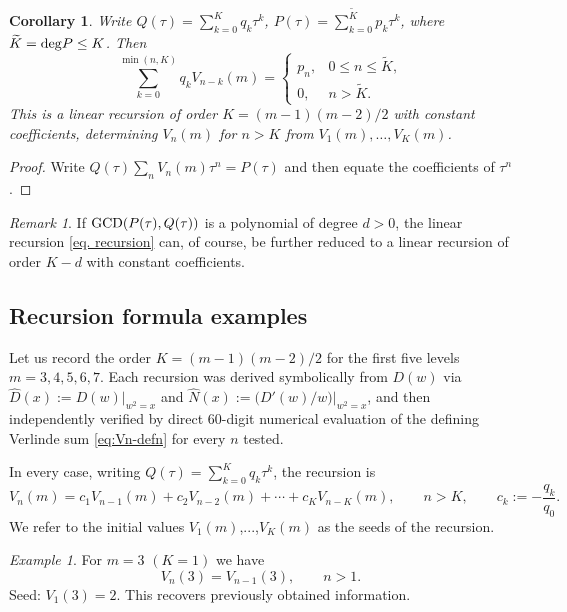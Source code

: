 \documentclass[11pt,reqno]{amsart}
\newtheorem{corollary}[theorem]{Corollary}
\theoremstyle{remark}
\newtheorem{remark}[theorem]{Remark}
\newtheorem{example}[theorem]{Example}
\begin{document}
\begin{corollary}
\label{cor:recursion}
Write $Q(\tau)=\sum_{k=0}^Kq_k\tau^k$, $P(\tau)=\sum_{k=0}^{\widetilde K}p_k\tau^k$, where $\widetilde{K}={\rm deg}P\leq K$.
Then
\begin{equation}\label{eq. recursion}
\sum_{k=0}^{\min(n,K)}q_kV_{n-k}(m) = \begin{cases}p_n, & 0\le n\le \widetilde K,\\0, & n>\widetilde K.\end{cases}
\end{equation}
This is a linear recursion of order $K=(m-1)(m-2)/2$ with constant
coefficients, determining $V_n(m)$ for $n>K$ from
$V_1(m),\dots,V_{K}(m)$.
\end{corollary}

\begin{proof}
Write $Q(\tau)\sum_nV_n(m)\tau^n=P(\tau)$
 and then equate the coefficients of
$\tau^n$.
\end{proof}

\begin{remark}
  If ${\rm GCD}(P(\tau), Q(\tau))$ is a polynomial of degree $d>0$, the linear recursion \eqref{eq. recursion} can, of course, be further reduced to a linear recursion of order $K-d$ with constant coefficients.
\end{remark}

\subsection{Recursion formula examples}\label{subsec:Recursion_formula_A}

\noindent Let us record the
order $K=(m-1)(m-2)/2$ for the first five levels $m=3,4,5,6,7$. Each
recursion was derived symbolically from $D(w)$ via $\widehat D(x):=D(w)|_{w^2=x}$ and
$\widehat N(x) := \big(D'(w)/w\big)\big|_{w^2=x}$, and then
independently verified by direct 60-digit numerical evaluation of the defining Verlinde sum \eqref{eq:Vn-defn}
for every $n$ tested.

\noindent In every case, writing $Q(\tau)=\sum_{k=0}^K q_k\tau^k$, the recursion is
$$
V_n(m) = c_1 V_{n-1}(m) + c_2 V_{n-2}(m) + \cdots + c_K V_{n-K}(m), \qquad n>K, \qquad c_k := -\frac{q_k}{q_0}.
$$
We refer to the initial values $V_{1}(m)$,...,$V_{K}(m)$ as the seeds of the recursion.

\begin{example}
  For $m=3$  $(K=1)$ we have
$$
V_n(3) = V_{n-1}(3), \qquad n>1.
$$
Seed: $V_1(3) = 2$. This recovers previously obtained information.
\end{example}
\end{document}

